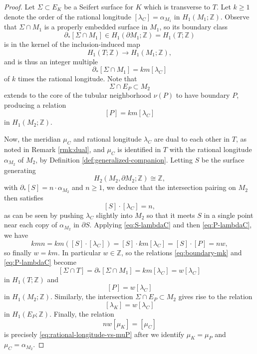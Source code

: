 \documentclass[10pt,a4paper]{amsart}
\newcommand{\Z}{\mathbb{Z}}
\begin{document}
\begin{proof}
Let $\Sigma \subset E_K$ be a Seifert surface for $K$ which is transverse to $T$.  Let $k \geq 1$ denote the order of the rational longitude $[\lambda_C] = \alpha_{M_1}$ in $H_1(M_1;\Z)$. 
Observe that $\Sigma \cap M_1$ is a properly embedded surface in $M_1$, so its boundary class
\begin{equation*} \label{eq:boundary-sigma-y0}
\partial_*[\Sigma \cap M_1] \in H_1(\partial M_1;\Z) = H_1(T;\Z)
\end{equation*}
is in the kernel of the inclusion-induced map \[H_1(T;\Z)\to H_1(M_1;\Z),\]  and is thus an integer multiple
\begin{equation}\label{eq:boundary-mk}
\partial_*[\Sigma \cap M_1]= km[\lambda_C]\end{equation}
of $k$ times the rational longitude.  Note that \[\Sigma \cap  E_P\subset M_2\] extends to the core of the tubular neighborhood $\nu(P)$ to have boundary $P$, producing a relation
\begin{equation} \label{eq:P-lambdaC}
[P] = km[\lambda_C]
\end{equation}
in $H_1(M_2;\Z)$.

Now, the meridian $\mu_C$ and rational longitude $\lambda_C$ are  dual to each other in $T$, as noted in Remark \ref{rmk:dual}, and $\mu_C$ is identified in $T$ with the rational longitude $\alpha_{M_2}$ of $M_2$, by Definition \ref{def:generalized-companion}.  Letting $S$ be the surface generating 
\[H_2(M_2,\partial M_2;\Z) \cong \Z,\] with $\partial_*[S] = n\cdot \alpha_{M_2}$ and $n \geq 1$, we deduce that the intersection pairing on $M_2$ then satisfies
\begin{equation} \label{eq:S-lambdaC}
[S] \cdot [\lambda_C] = n,
\end{equation}
as can be seen by pushing $\lambda_C$ slightly into $M_2$ so that it meets $S$ in a single point near each copy of $\alpha_{M_2}$ in $\partial S$.  Applying \eqref{eq:S-lambdaC} and then \eqref{eq:P-lambdaC}, we have
\[ kmn = km\left([S] \cdot [\lambda_C]\right) = [S] \cdot km[\lambda_C] = [S] \cdot [P] = nw, \]
so finally $w = km$.  In particular $w \in \Z$, so the relations \eqref{eq:boundary-mk} and \eqref{eq:P-lambdaC} become
\[ [\Sigma \cap T] = \partial_*[\Sigma \cap M_1] = km [\lambda_C]=w[\lambda_C] \]
in $H_1(T;\Z)$ and \[[P] = w[\lambda_C]\] in $H_1(M_2;\Z)$.  Similarly, the intersection $\Sigma \cap E_P \subset M_2$  gives rise to the relation \[[\lambda_K] = w[\lambda_C]\] in $H_1(E_P;\Z)$.  Finally, the relation \[nw[\mu_K] = [\mu_C]\] is precisely \eqref{eq:rational-longitude-vs-muP} after we identify $\mu_K = \mu_P$ and $\mu_C = \alpha_{M_2}$.
\end{proof}
\end{document}
